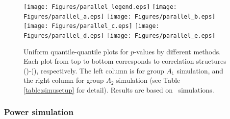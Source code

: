 	
	
	\begin{figure}[!ht]
		\begin{center}
			\texttt{[image: Figures/parallel\_legend.eps]}
			\texttt{[image: Figures/parallel\_a.eps]}
			\texttt{[image: Figures/parallel\_b.eps]}
			\texttt{[image: Figures/parallel\_c.eps]}
			\texttt{[image: Figures/parallel\_d.eps]}
			\texttt{[image: Figures/parallel\_e.eps]}
		\end{center} 
		\caption[Uniform quantile-quantile plots for $p$-values by different methods]{Uniform 
		quantile-quantile plots for $p$-values by different methods. Each plot 
		from top to
			bottom corresponds to correlation structures (\aaCase)-(\fCase), respectively. The left 
			column is
			for group $A_1$ simulation, and the right column for group $A_2$ simulation (see Table
			\ref{table:simusetup} for detail). Results are based on
			\HowmanySimu~simulations.}\label{fig:typeIerror}
	\end{figure} 
	
	
	\subsubsection{Power simulation}\label{subsection:power}		 
	
	
